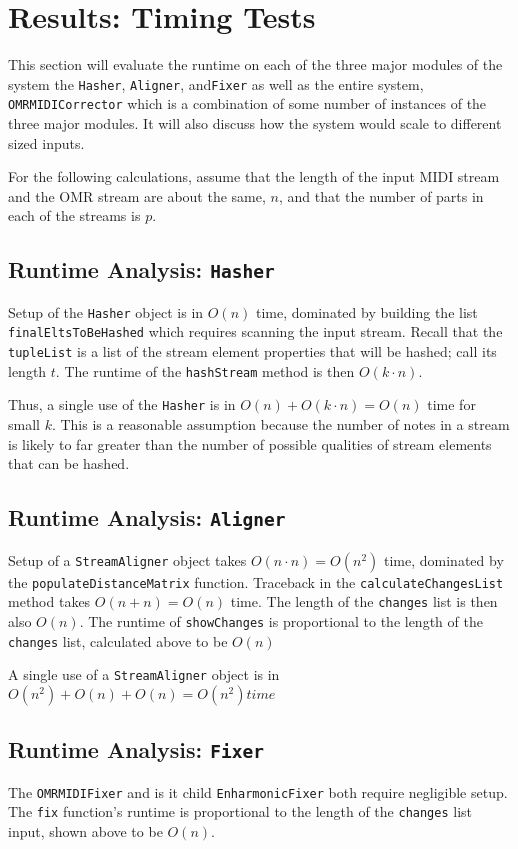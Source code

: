 \section{Results: Timing Tests} \label{timing}
This section will evaluate the runtime on each of the three major modules of the system the \texttt{Hasher}, \texttt{Aligner}, and\texttt{Fixer} as well as the entire system, \texttt{OMRMIDICorrector} which is a combination of some number of instances of the three major modules. It will also discuss how the system would scale to different sized inputs. 

For the following calculations, assume that the length of the input MIDI stream and the OMR stream are about the same, $n$, and that the number of parts in each of the streams is $p$. 

\subsection{Runtime Analysis: \texttt{Hasher}}
Setup of the \texttt{Hasher} object is in $O(n)$ time, dominated by building the list \texttt{finalEltsToBeHashed} which requires scanning the input stream. Recall that the \texttt{tupleList} is a list of the stream element properties that will be hashed; call its length $t$. The runtime of the \texttt{hashStream} method is then $O(k \cdot n)$. 

Thus, a single use of the \texttt{Hasher} is in $O(n) + O(k \cdot n) = O(n)$ time for small $k$. This is a reasonable assumption because the number of notes in a stream is likely to far greater than the number of possible qualities of stream elements that can be hashed. 

\subsection{Runtime Analysis: \texttt{Aligner}}
Setup of a \texttt{StreamAligner} object takes $O(n \cdot n) = O(n^2)$ time, dominated by the \texttt{populateDistanceMatrix} function. Traceback in the \texttt{calculateChangesList} method takes $O(n+ n) = O(n)$ time. The length of the \texttt{changes} list is then also $O(n)$. The runtime of \texttt{showChanges} is proportional to the length of the \texttt{changes} list, calculated above to be $O(n)$

A single use of a \texttt{StreamAligner} object is in $O(n^2) + O(n) +O(n) = O(n^2) time$ 

\subsection{Runtime Analysis: \texttt{Fixer}}
The \texttt{OMRMIDIFixer} and is it child \texttt{EnharmonicFixer} both require negligible setup. The \texttt{fix} function's runtime is proportional to the length of the \texttt{changes} list input, shown above to be $O(n)$. 


